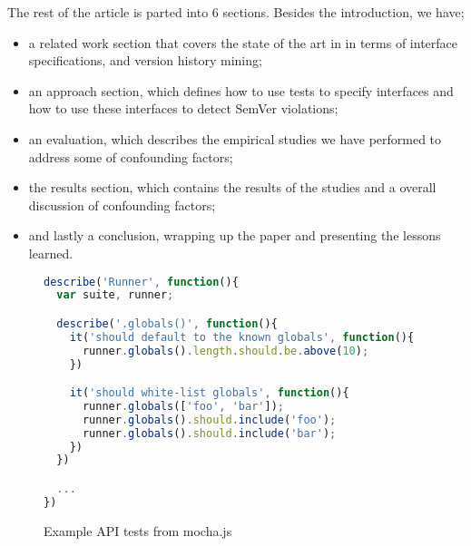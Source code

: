 The rest of the article is parted into 6 sections. Besides the introduction, we
have; 
\begin{itemize}

    \item a related work section that covers the state of the art in in terms
    of interface specifications, and version history mining; 

    \item an approach section, which defines how to use tests to specify
    interfaces and how to use these interfaces to detect SemVer violations;

    \item an evaluation, which describes the empirical studies we have
    performed to address some of confounding factors;

    \item the results section, which contains the results of the studies and a
    overall discussion of confounding factors;

    \item and lastly a conclusion, wrapping up the paper and presenting the
    lessons learned.

\end{itemize}

%

\begin{figure*}
\begin{lstlisting}[language=javascript]
describe('Runner', function(){
  var suite, runner;

  describe('.globals()', function(){
    it('should default to the known globals', function(){
      runner.globals().length.should.be.above(10);
    })

    it('should white-list globals', function(){
      runner.globals(['foo', 'bar']);
      runner.globals().should.include('foo');
      runner.globals().should.include('bar');
    })
  })

  ...
})
\end{lstlisting}

\caption{Example API tests from mocha.js}
\end{figure*}